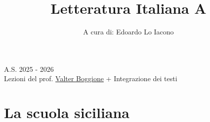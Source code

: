 \documentclass[a4paper, 11pt]{article}
\title{Letteratura Italiana A}
\author{A cura di: Edoardo Lo Iacono}
\date{}
\begin{document}
\maketitle

\vfill 

\begin{center}
    A.S. 2025 - 2026 \\
    Lezioni del prof. \href{https://cdslettere.campusnet.unito.it/do/docenti.pl/Alias?valter.boggione#tab-profilo}{Valter Boggione} + Integrazione dei testi
\end{center}

\newpage
\tableofcontents
\newpage

\section{La scuola siciliana}
\end{document}
